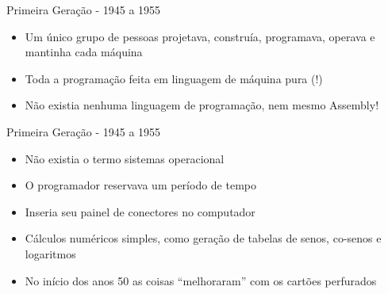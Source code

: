 \documentclass{beamer}
\begin{document}
  \begin{frame}{Primeira Geração - 1945 a 1955}
      \begin{itemize}
          \item Um único grupo de pessoas projetava, construía, programava, operava e mantinha cada máquina
          \item Toda a programação feita em linguagem de máquina pura (!)
          \item Não existia nenhuma linguagem de programação, nem mesmo Assembly!
      \end{itemize}
  \end{frame}
  \begin{frame}{Primeira Geração - 1945 a 1955}
      \begin{itemize}
          \item Não existia o termo sistemas operacional
          \item O programador reservava um período de tempo
          \item Inseria seu painel de conectores no computador
          \item Cálculos numéricos simples, como geração de tabelas de senos, co-senos e logaritmos
          \item No início dos anos 50 as coisas “melhoraram” com os cartões perfurados
      \end{itemize}
  \end{frame}
  
            
\end{document}
